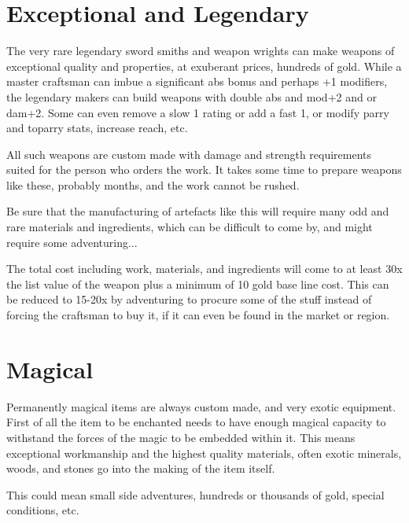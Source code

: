 

\goodbreak
{}
\section*{Exceptional and Legendary}
The very rare legendary sword smiths and weapon wrights can make weapons of exceptional quality and properties, at exuberant prices, hundreds of gold. While a master craftsman can imbue a significant abs bonus and perhaps +1 modifiers, the legendary makers can build weapons with double abs and mod+2 and or dam+2. Some can even remove a slow 1 rating or add a fast 1, or modify parry and toparry stats, increase reach, etc.

All such weapons are custom made with damage and strength requirements suited for the person who orders the work. It takes some time to prepare weapons like these, probably months, and the work cannot be rushed.

Be sure that the manufacturing of artefacts like this will require many odd and rare materials and ingredients, which can be difficult to come by, and might require some adventuring...

The total cost including work, materials, and ingredients will come to at least 30x the list value of the weapon plus a minimum of 10 gold base line cost. This can be reduced to 15-20x by adventuring to procure some of the stuff instead of forcing the craftsman to buy it, if it can even be found in the market or region.


\section*{Magical}
Permanently magical items are always custom made, and very exotic equipment.
First of all the item to be enchanted needs to have enough magical capacity to withstand the forces of the magic to be embedded within it. This means exceptional workmanship and the highest quality materials, often exotic minerals, woods, and stones go into the making of the item itself.

This could mean small side adventures, hundreds or thousands of gold, special conditions, etc.


